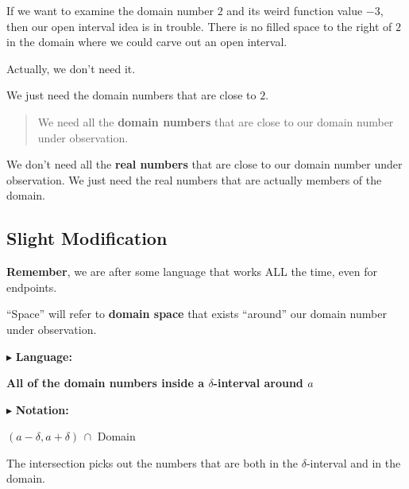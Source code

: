 \documentclass{ximera}
\begin{document}
If we want to examine the domain number $2$ and its weird function value $-3$, then our open interval idea is in trouble.  There is no filled space to the right of $2$ in the domain where we could carve out an open interval.


Actually, we don't need it. 


We just need the domain numbers that are close to $2$.


\begin{quote}
We need all the \textbf{\textcolor{purple!85!blue}{domain numbers}} that are close to our domain number under observation.
\end{quote}



We don't need all the \textbf{\textcolor{purple!70!blue}{real numbers}} that are close to our domain number under observation. We just need the real numbers that are actually members of the domain.




\subsection*{Slight Modification}


\textbf{Remember}, we are after some language that works ALL the time, even for endpoints.   



``Space'' will refer to \textbf{\textcolor{red!70!darkgray}{domain space}} that exists ``around'' our domain number under observation. 



$\blacktriangleright$ \textbf{\textcolor{purple!85!blue}{Language:}}   

\begin{center}
\textbf{All of the domain numbers inside a $\delta$-interval around $a$} 
\end{center}






$\blacktriangleright$ \textbf{\textcolor{purple!85!blue}{Notation:}}   

\begin{center}
$(a - \delta, a + \delta) \, \cap$ Domain
\end{center}



The intersection picks out the numbers that are both in the $\delta$-interval and in the domain. 
\end{document}
